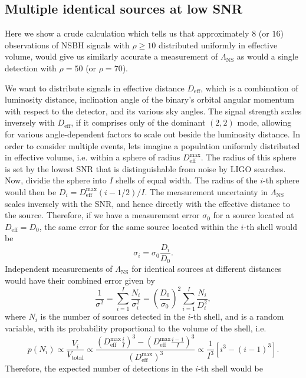 \documentclass[aps,prd,amsmath,floats,floatfix, twocolumn,
superscriptaddress,nofootinbib,showpacs]{revtex4-1}
\newcommand{\lambdans}{\Lambda_\mathrm{NS}}
\newcommand{\deff}{D_\mathrm{eff}}
\begin{document}
% 
\subsection{Multiple identical sources at low SNR}\label{s2:identical_multiple}
% 
% 
Here we show a crude calculation which tells us that approximately $8$ (or $16$) observations
of NSBH signals with $\rho\geq 10$ distributed uniformly in effective volume, would
give us similarly accurate a measurement of $\lambdans$ as would a single detection
with $\rho=50$ (or $\rho=70$). 


We want to distribute signals in effective distance $\deff$, which is a combination of 
luminosity distance, inclination angle of the binary's orbital angular momentum
with respect to the detector, and its various sky angles. The signal strength 
scales inversely with $\deff$, if it comprises only of the dominant $(2,2)$ mode, allowing
for various angle-dependent factors to scale out beside the luminosity distance.
% 
In order to consider multiple events, lets imagine a population uniformly distributed
in effective volume, i.e. within a sphere of radius $\deff^\mathrm{max}$. The 
radius of this sphere is set by the lowest SNR that is distinguishable from noise
by LIGO searches. Now, dividie the sphere into $I$ shells of equal width. The radius
of the $i$-th sphere would then be $D_i = \deff^\mathrm{max} (i - 1/2)/I$. The 
measurement uncertainty in $\lambdans$ scales inversely with the SNR, and hence
directly with the effective distance to the source. Therefore, if we have a 
measurement error $\sigma_0$ for a source located at $\deff = D_0$, the same error
for the same source located within the $i$-th shell would be 
$$
\sigma_i = \sigma_0 \frac{D_i}{D_0}.
$$
Independent measurements of $\lambdans$ for identical sources at different distances
would have their combined error given by
\begin{equation}\label{eq:1oversigma}
\frac{1}{\sigma^2} = \sum_{i=1}^I \frac{N_i}{\sigma_i^2} = \left(\frac{D_0}{\sigma_0}\right)^2 \sum_{i=1}^I\frac{N_i}{D_i^2},
\end{equation}
where $N_i$ is the number of sources detected in the $i$-th shell, and is a random
variable, with its probability proportional to the volume of the shell, i.e.
$$
p(N_i) \propto \frac{V_i}{V_\mathrm{total}} \propto \dfrac{\left(\deff^\mathrm{max} \frac{i}{I}\right)^3 - \left(\deff^\mathrm{max} \frac{i-1}{I}\right)^3}{(\deff^\mathrm{max})^3} \propto \frac{1}{I^3} [i^3 - (i-1)^3].
$$
Therefore, the expected number of detections in the $i$-th shell would be
\end{document}
